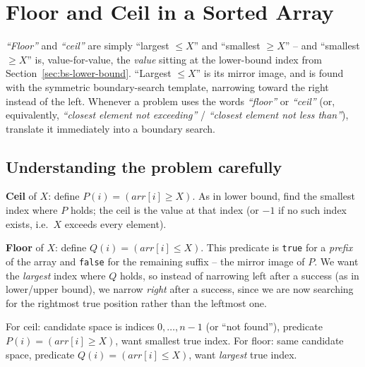 \section{Floor and Ceil in a Sorted Array}
\label{sec:bs-floor-ceil}


\begin{patternbox}
\emph{``Floor''} and \emph{``ceil''} are simply ``largest $\le X$'' and
``smallest $\ge X$'' -- and ``smallest $\ge X$'' is, value-for-value, the
\emph{value} sitting at the lower-bound index from
Section~\ref{sec:bs-lower-bound}. ``Largest $\le X$'' is its mirror image,
and is found with the symmetric boundary-search template, narrowing toward
the right instead of the left. Whenever a problem uses the words
\emph{``floor''} or \emph{``ceil''} (or, equivalently, \emph{``closest
element not exceeding''} / \emph{``closest element not less than''}),
translate it immediately into a boundary search.
\end{patternbox}

\subsection*{Understanding the problem carefully}

\textbf{Ceil} of $X$: define $P(i) = (\textit{arr}[i] \ge X)$. As in lower
bound, find the smallest index where $P$ holds; the ceil is the value at
that index (or $-1$ if no such index exists, i.e.\ $X$ exceeds every
element).

\textbf{Floor} of $X$: define $Q(i) = (\textit{arr}[i] \le X)$. This
predicate is \texttt{true} for a \emph{prefix} of the array and
\texttt{false} for the remaining suffix -- the mirror image of $P$. We want
the \emph{largest} index where $Q$ holds, so instead of narrowing left
after a success (as in lower/upper bound), we narrow \emph{right} after a
success, since we are now searching for the rightmost true position rather
than the leftmost one.

\begin{ideabox}
For ceil: candidate space is indices $0,\dots,n-1$ (or ``not found''),
predicate $P(i) = (\textit{arr}[i] \ge X)$, want smallest true index.
For floor: same candidate space, predicate $Q(i) = (\textit{arr}[i] \le X)$,
want \emph{largest} true index.
\end{ideabox}

